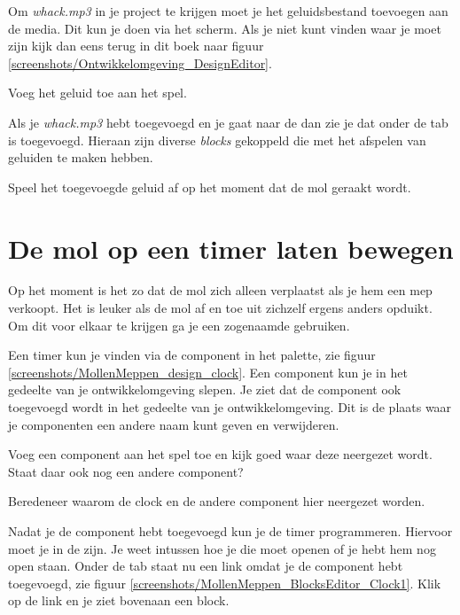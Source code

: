 Om \emph{whack.mp3} in je project te krijgen moet je het geluidsbestand toevoegen aan de media. Dit kun je doen via het  scherm. Als je niet kunt vinden waar je moet zijn kijk dan eens terug in dit boek naar figuur \ref{screenshots/Ontwikkelomgeving_DesignEditor}.

\begin{opgave}
    \opgVraag
	Voeg het geluid toe aan het spel. 
\end{opgave}

Als je \emph{whack.mp3} hebt toegevoegd en je gaat naar de  dan zie je dat onder de  tab  is toegevoegd. Hieraan zijn diverse \emph{blocks} gekoppeld die met het afspelen van geluiden te maken hebben. 
 
\begin{opgave}
    \opgVraag
	Speel het toegevoegde geluid af op het moment dat de mol geraakt wordt. 
\end{opgave}


\section{De mol op een timer laten bewegen}
Op het moment is het zo dat de mol zich alleen verplaatst als je hem een mep verkoopt. Het is leuker als de mol af en toe uit zichzelf ergens anders opduikt. Om dit voor elkaar te krijgen ga je een zogenaamde  gebruiken.
 
Een timer kun je vinden via de  component in het  palette, zie figuur \ref{screenshots/MollenMeppen_design_clock}. Een component kun je in het  gedeelte van je ontwikkelomgeving slepen. Je ziet dat de component ook toegevoegd wordt in het  gedeelte van je ontwikkelomgeving. Dit is de plaats waar je componenten een andere naam kunt geven en verwijderen.
 
 
\begin{opgave}
    \opgVraag
	Voeg een  component aan het spel toe en kijk goed waar deze neergezet wordt. Staat daar ook nog een andere component?

  Beredeneer waarom de clock en de andere component hier neergezet worden. 
\end{opgave}

Nadat je de  component hebt toegevoegd kun je de timer programmeren. Hiervoor moet je in de  zijn. Je weet intussen hoe je die moet openen of je hebt hem nog open staan. 
Onder de  tab staat nu een  link omdat je de  component hebt toegevoegd, zie figuur \ref{screenshots/MollenMeppen_BlocksEditor_Clock1}. Klik op de link en je ziet bovenaan een  block.

